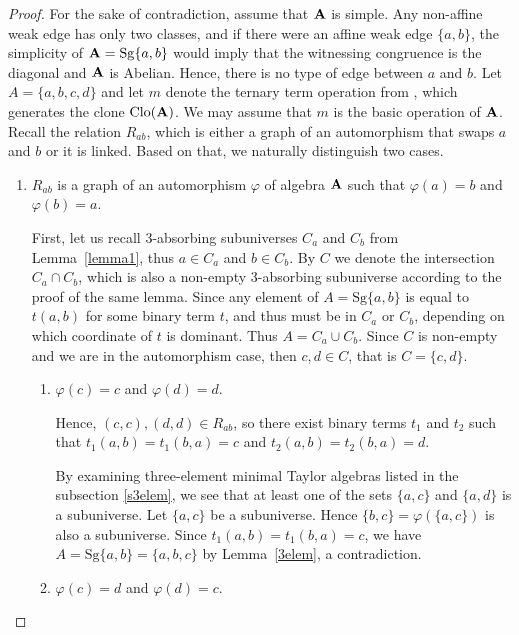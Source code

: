\documentclass[11pt]{amsart}
\newcommand{\m}[1]{\mathbf{\uppercase{#1}}}
\theoremstyle{definition}
\theoremstyle{remark}
\theoremstyle{plain}
\begin{document}
\begin{proof} For the sake of contradiction, assume that $\m a$ is simple. Any non-affine weak edge has only two classes, and if there were an affine weak edge $\{a,b\}$, the simplicity of $\m a=\mathrm{Sg}\{a,b\}$ would imply that the witnessing congruence is the diagonal and $\m a$ is Abelian. Hence, there is no type of edge between $a$ and $b$. Let $A=\{a,b,c,d\}$ and let $m$ denote the ternary term operation from , which generates the clone $\mathrm{Clo}(\m a)$. We may assume that $m$ is the basic operation of $\m a$. Recall the relation $R_{ab}$, which is either a graph of an automorphism that swaps $a$ and $b$ or it is linked. Based on that, we naturally distinguish two cases.

\begin{enumerate}[wide, labelwidth=!,itemindent=!,labelindent=0pt]
\item[{\sc{\textbf{Case 1.}}}]  $R_{ab}$ is a graph of an automorphism $\varphi$ of algebra ${\m A}$ such that $\varphi (a)=b$ and $\varphi (b)=a$.

First, let us recall 3-absorbing subuniverses $C_a$ and $C_b$ from Lemma~\ref{lemma1}, thus $a\in C_a$ and $b\in C_b$. By $C$ we denote the intersection $ C_a\cap C_b$, which is also a non-empty 3-absorbing subuniverse according to the proof of the same lemma. Since any element of $A=\mathrm{Sg}\{a,b\}$ is equal to $t(a,b)$ for some binary term $t$, and thus must be in $C_a$ or $C_b$, depending on which coordinate of $t$ is dominant. Thus $A=C_a\cup C_b$. Since $C$ is non-empty and we are in the automorphism case, then $c,d\in C$, that is  $C=\{c,d\}$. 
\begin{enumerate}[wide, labelindent=0pt]
    \item[{\sc{\textbf{Subcase 1a.}}}] $\varphi (c)=c$ and $\varphi (d)=d$. 
    
    Hence, $(c,c),(d,d)\in R_{ab}$, so there exist binary terms $t_1$ and $t_2$ such that $t_1(a,b)=t_1(b,a)=c$ and $t_2(a,b)=t_2(b,a)=d$.

By examining three-element minimal Taylor algebras listed in the subsection \ref{s3elem}, we see that at least one of the sets $\{a,c\}$ and $\{a,d\}$ is a subuniverse. Let $\{a,c\}$ be a subuniverse. Hence $\{b,c\}=\varphi(\{a,c\})$ is also a subuniverse. Since $t_1(a,b)=t_1(b,a)=c$, we have $A=\mathrm{Sg}\{a,b\}=\{a,b,c\}$ by Lemma~\ref{3elem}, a contradiction.

    \item[{\sc{\textbf{Subcase 1b.}}}] $\varphi (c)=d$ and $\varphi (d)=c$.
    

\end{enumerate}
\end{enumerate}
\end{proof}
\end{document}
